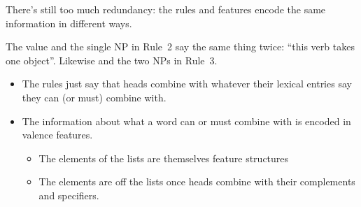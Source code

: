 \documentclass[a4paper,landscape,headrule,footrule]{foils}
\begin{document}
There’s still too much redundancy: the rules and features encode the same information in different ways.

\begin{small}
\hspace{22mm}%

\hspace{22mm}%

\hspace{22mm}%
\end{small}

\medskip
The value  and the single NP in Rule~2 say the same thing
twice: ``this verb takes one object''.  Likewise  and the two
NPs in Rule~3.


\begin{itemize}
\item The rules just say that heads combine with whatever
their lexical entries say they can (or must) combine
with.
\item The information about what a word can or must
combine with is encoded in  valence
features.
\begin{itemize}
\item The elements of the lists are themselves feature structures
\item The elements are  off the lists once heads
combine with their complements and specifiers.
\end{itemize}
\end{itemize}
\end{document}
